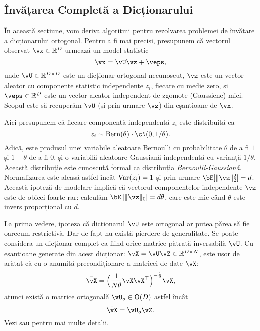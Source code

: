 \documentclass[../../book-main_ro.tex]{subfiles}
\begin{document}
\subsection{Învățarea Completă a Dicționarului}
\label{sec:complete-dictionary}

În această secțiune, vom deriva algoritmi pentru rezolvarea problemei de învățare a dicționarului ortogonal. Pentru a fi mai preciși, presupunem că vectorul observat $\vx \in \R^D$ urmează un model statistic
\begin{equation}
    \vx = \vU \vz + \veps, 
    \label{eq:ica-model-ch2}
\end{equation}
unde $\vU \in \R^{D \times D}$ este un dicționar ortogonal necunoscut, $\vz$ este un vector aleator cu componente statistic independente $z_i$, fiecare cu medie zero, și $\veps \in \R^D$ este un vector aleator independent de zgomote (Gaussiene) mici. Scopul este să recuperăm $\vU$ (și prin urmare $\vz$) din eșantioane de $\vx$.

Aici presupunem că fiecare componentă independentă $z_i$ este distribuită ca $$z_i \sim \mathrm{Bern}(\theta) \cdot \cN(0, 1/\theta).$$ Adică, este produsul unei variabile aleatoare Bernoulli cu probabilitate $\theta$ de a fi $1$ și $1-\theta$ de a fi $0$, și o variabilă aleatoare Gaussiană independentă cu varianță $1/\theta$. Această distribuție este cunoscută formal ca distribuția {\em Bernoulli-Gaussiană}. 
Normalizarea este aleasă astfel încât $\operatorname{Var}(z_i) = 1$ și prin urmare $\bE[\norm{\vz}_2^2]=d$. 
Această ipoteză de modelare implică că vectorul componentelor independente $\vz$ este de obicei foarte rar: 
calculăm $\bE\left[\norm{\vz}_0\right] = d\theta$, care este mic când $\theta$ este invers proporțional cu $d$. 

\begin{remark} 
La prima vedere, ipoteza că dicționarul $\vU$ este ortogonal ar putea părea să fie oarecum restrictivă. Dar de fapt nu există pierdere de generalitate. Se poate considera un dicționar complet ca fiind orice matrice pătrată inversabilă $\vU$. Cu eșantioane generate din acest dicționar: $\vX = \vU \vZ \in \mathbb{R}^{D\times N}$, este ușor de arătat că cu o anumită precondiționare a matricei de date $\vX$: 
\begin{equation}
    \bar{\vX} = \Big(\frac{1}{N\theta} \vX\vX^\top\Big)^{-\frac{1}{2}}\vX,
\end{equation}
atunci există o matrice ortogonală $\vU_{o} \in \O(D)$ astfel încât
\begin{equation}
    \bar{\vX} = \vU_{o}\vZ.
\end{equation}
    Vezi  sau \cite{sun2017completeI} pentru mai multe detalii.
\end{remark}
\end{document}
